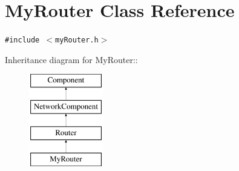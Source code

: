 \hypertarget{classMyRouter}{
\section{MyRouter Class Reference}
\label{classMyRouter}
}
{\tt \#include $<$myRouter.h$>$}

Inheritance diagram for MyRouter::\begin{figure}[H]
\begin{center}
\leavevmode
\includegraphics[height=4cm]{classMyRouter}
\end{center}
\end{figure}
